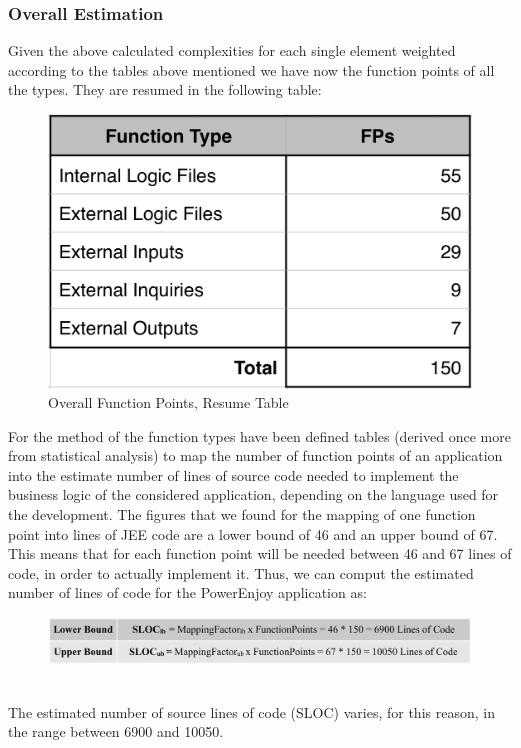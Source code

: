 \documentclass[a4paper,10pt]{article}
\begin{document}
  \subsubsection{Overall Estimation} Given the above calculated complexities for each single element weighted according to
  the tables above mentioned we have now the function points of all the types. They are resumed in the following table:
    \begin{figure}[h]
  \centering
    \includegraphics[scale=0.2]{Resources/overall.png}
    \caption{Overall Function Points, Resume Table}
  \end{figure}
  For the method of the function types have been defined tables (derived once more from statistical analysis) to map the number of function points
  of an application into the estimate number of lines of source code needed to implement the business logic of the considered application, 
  depending on the language used for the development.
  The figures that we found for the mapping of one function point into lines of JEE code are a lower bound of 46 and an upper bound
  of 67. This means that for each 
  function point will be needed between 46 and 67 lines of code, in order to actually implement it.
  Thus, we can comput the estimated number of lines of code for the PowerEnjoy application as:\\
    \begin{figure}[h]
  \centering
    \includegraphics[scale=0.32]{Resources/sloc.png}
  \end{figure}
  \bigskip \\The estimated number of source lines of code (SLOC) varies, for this reason, in the range between 6900 and 10050.
\end{document}
